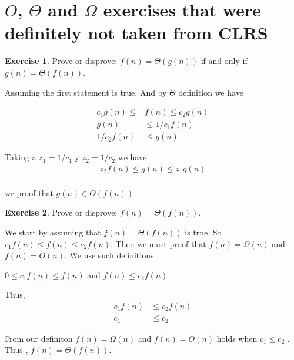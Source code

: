 \documentclass{article}
\theoremstyle{definition}
\newtheorem{exercise}{Exercise}[section]
\begin{document}
\section{$O$, $\Theta$ and $\Omega$ exercises that were definitely not taken from CLRS}


\begin{exercise}

    Prove or disprove: $f(n) = \Theta(g(n))$ if and only if $g(n) = \Theta(f(n))$.

    Assuming the first statement is true. And by $\Theta$ definition we have

    \begin{align*}
    c_1g(n)\leqslant &f(n) \leqslant c_2g(n)\\
    g(n) &\leqslant 1/c_1f(n)\\
    1/c_2f(n) &\leqslant g(n)
    \end{align*}    

    Taking a $z_1 = 1/c_1$ y $z_2=1/c_2$ we have
    \begin{align*}
        z_2f(n) \leqslant g(n) \leqslant z_1g(n)\\
    \end{align*}
    
    we proof that $g(n) \in \Theta(f(n))$
        
\end{exercise}

\begin{exercise}

    Prove or disprove: $f(n) = \Theta(f(n))$.

    We start by assuming that $f(n) = \Theta(f(n))$ is true. So 
    $c_1f(n) \leqslant f(n) \leqslant c_2f(n)$.
    Then we must proof that $f(n)= \Omega(n)$ and $f(n)= O(n)$. We use such definitions\\    
    \begin{center}
    $0 \leqslant c_1f(n) \leqslant f(n)$ and 
    $f(n)\leqslant c_2f(n)$
    \end{center}
    Thus,\\
    \begin{align*}
        c_1f(n) &\leqslant c_2f(n)\\
        c_1 &\leqslant c_2
    \end{align*}

    From our definiton $f(n)= \Omega(n)$ and $f(n)= O(n)$ holds when $c_1 \leqslant c_2$ .
    Thus , $f(n) = \Theta(f(n))$.

    
\end{exercise}
\end{document}

